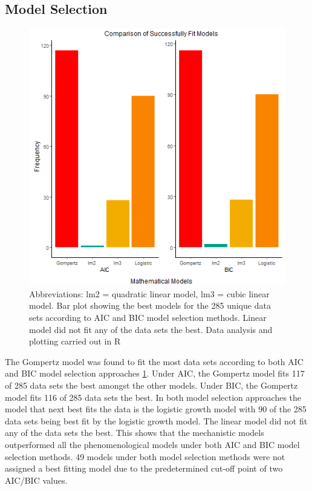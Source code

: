 \documentclass[11pt]{article}
\begin{document}
    \subsection{Model Selection}
        \begin{figure}[h!]
	        \centering
  	    	\includegraphics[scale = 0.5]{images/fig_1.png}
  		    \caption{Abbreviations: lm2 = quadratic linear model, lm3 = cubic linear model. Bar plot showing the best models for the 285 unique data sets according to AIC and BIC model selection methods. Linear model did not fit any of the data sets the best. Data analysis and plotting carried out in R}
  		    \label{Figure 1}
    	\end{figure}
    
    The Gompertz model was found to fit the most data sets according to both AIC and BIC model selection approaches \ref{Figure 1}. Under AIC, the Gompertz model fits 117 of 285 data sets the best amongst the other models. Under BIC, the Gompertz model fits 116 of 285 data sets the best. In both model selection approaches the model that next best fits the data is the logistic growth model with 90 of the 285 data sets being best fit by the logistic growth model. The linear model did not fit any of the data sets the best. This shows that the mechanistic models outperformed all the phenomenological models under both AIC and BIC model selection methods. 49 models under both model selection methods were not assigned a best fitting model due to the predetermined cut-off point of two AIC/BIC values.
    
\end{document}
